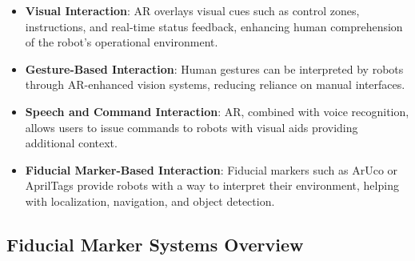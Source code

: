 \begin{itemize}
    \item \textbf{Visual Interaction}: AR overlays visual cues such as control zones, instructions, and real-time status feedback, enhancing human comprehension of the robot's operational environment.
    \item \textbf{Gesture-Based Interaction}: Human gestures can be interpreted by robots through AR-enhanced vision systems, reducing reliance on manual interfaces.
    \item \textbf{Speech and Command Interaction}: AR, combined with voice recognition, allows users to issue commands to robots with visual aids providing additional context.
    \item \textbf{Fiducial Marker-Based Interaction}: Fiducial markers such as ArUco or AprilTags provide robots with a way to interpret their environment, helping with localization, navigation, and object detection.
\end{itemize}

\subsection{Fiducial Marker Systems Overview}

